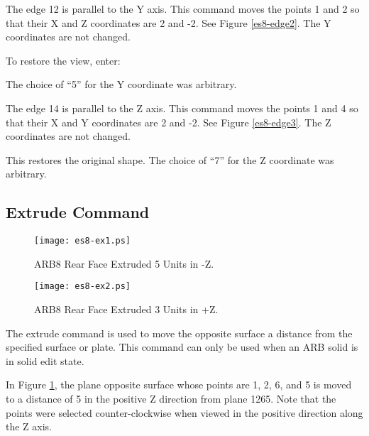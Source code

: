 The edge 12 is parallel to the Y axis.  This command moves the points 1
and 2 so that their X and Z coordinates are 2 and -2.
See Figure \ref{es8-edge2}.
The Y coordinates are not changed.

To restore the view, enter:


The choice of ``5'' for the Y coordinate was arbitrary.


The edge 14 is parallel to the Z axis.
This command moves the points 1
and 4 so that their X and Y coordinates are 2 and -2.
See Figure \ref{es8-edge3}.
The Z coordinates are not changed.


This restores the original shape.
The choice of ``7'' for the Z coordinate was arbitrary.

\subsection{Extrude Command}

\begin{figure}
\centering \texttt{[image: es8-ex1.ps]}
\caption{ARB8 Rear Face Extruded 5 Units in -Z.}
\label{es8-ex1}
\end{figure}

\begin{figure}
\centering \texttt{[image: es8-ex2.ps]}
\caption{ARB8 Rear Face Extruded 3 Units in +Z.}
\label{es8-ex2}
\end{figure}

The extrude command is used to move the opposite surface a distance from
the specified surface or plate.
This command can only be used when an ARB solid is in
solid edit state.


In Figure \ref{es8-ex1},
the plane opposite surface whose points are 1, 2, 6, and 5
is moved to a distance of 5 in the positive Z direction from plane 1265.  Note
that the points were selected counter-clockwise when viewed in the positive
direction along the Z axis.


